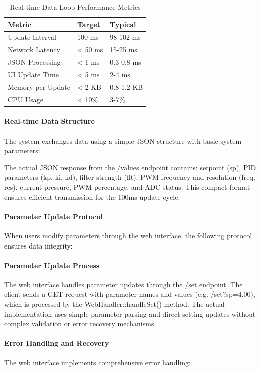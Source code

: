 \begin{table}[H]
\centering
\begin{tabular}{@{}lll@{}}
\toprule
\textbf{Metric} & \textbf{Target} & \textbf{Typical} \\
\midrule
Update Interval & 100 ms & 98-102 ms \\
Network Latency & < 50 ms & 15-25 ms \\
JSON Processing & < 1 ms & 0.3-0.8 ms \\
UI Update Time & < 5 ms & 2-4 ms \\
Memory per Update & < 2 KB & 0.8-1.2 KB \\
CPU Usage & < 10\% & 3-7\% \\
\bottomrule
\end{tabular}
\caption{Real-time Data Loop Performance Metrics}
\end{table}

\paragraph{Real-time Data Structure}
The system exchanges data using a simple JSON structure with basic system parameters:

The actual JSON response from the /values endpoint contains: setpoint (sp), PID parameters (kp, ki, kd), filter strength (flt), PWM frequency and resolution (freq, res), current pressure, PWM percentage, and ADC status. This compact format ensures efficient transmission for the 100ms update cycle.

\paragraph{Parameter Update Protocol}
When users modify parameters through the web interface, the following protocol ensures data integrity:

\paragraph{Parameter Update Process}
The web interface handles parameter updates through the /set endpoint. The client sends a GET request with parameter names and values (e.g. /set?sp=4.00), which is processed by the WebHandler::handleSet() method. The actual implementation uses simple parameter parsing and direct setting updates without complex validation or error recovery mechanisms.

\paragraph{Error Handling and Recovery}
The web interface implements comprehensive error handling:

